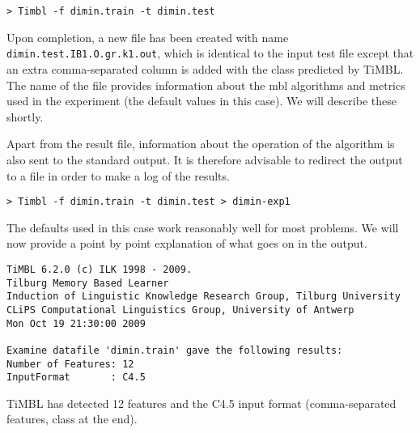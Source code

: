 \documentclass{report}
\begin{document}
{\footnotesize
\begin{verbatim}
> Timbl -f dimin.train -t dimin.test
\end{verbatim}
}

Upon completion, a new file has been created with name {\small\tt
dimin.test.IB1.O.gr.k1.out}, which is identical to the
input test file except that an extra comma-separated column is added
with the class predicted by TiMBL. The name of the file provides
information about the {\sc mbl} algorithms and metrics used in the
experiment (the default values in this case). We will describe these
shortly.

Apart from the result file, information about the operation of the
algorithm is also sent to the standard output. It is therefore 
advisable to redirect the output to a file in order to make a log of
the results.

{\footnotesize
\begin{verbatim}
> Timbl -f dimin.train -t dimin.test > dimin-exp1
\end{verbatim}
}

The defaults used in this case work reasonably well for most problems.  We
will now provide a point by point explanation of what goes on in the
output.



{\footnotesize
\begin{verbatim}
TiMBL 6.2.0 (c) ILK 1998 - 2009.
Tilburg Memory Based Learner
Induction of Linguistic Knowledge Research Group, Tilburg University
CLiPS Computational Linguistics Group, University of Antwerp
Mon Oct 19 21:30:00 2009

Examine datafile 'dimin.train' gave the following results:
Number of Features: 12
InputFormat       : C4.5
\end{verbatim}
}



TiMBL has detected 12 features and the C4.5 input format
(comma-separated features, class at the end).

\end{document}
